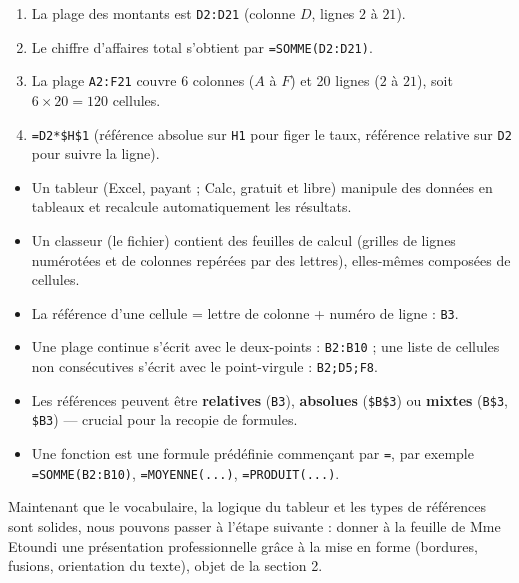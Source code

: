 \documentclass[11pt]{article}
\newcommand{\cle}[1]{{\popxbold\color{popdark}#1}}
\begin{document}
\begin{corrige}[Exercice 1]
\begin{enumerate}
\item La plage des montants est \texttt{D2:D21} (colonne $D$, lignes $2$ à $21$).
\item Le chiffre d'affaires total s'obtient par \texttt{=SOMME(D2:D21)}.
\item La plage \texttt{A2:F21} couvre 6 colonnes ($A$ à $F$) et 20 lignes ($2$ à $21$), soit $6 \times 20 = 120$ cellules.
\item \texttt{=D2*\$H\$1} (référence absolue sur \texttt{H1} pour figer le taux, référence relative sur \texttt{D2} pour suivre la ligne).
\end{enumerate}
\end{corrige}

\begin{aretenir}
\begin{itemize}
\item Un \cle{tableur} (Excel, payant ; Calc, gratuit et libre) manipule des données en tableaux et recalcule automatiquement les résultats.
\item Un \cle{classeur} (le fichier) contient des \cle{feuilles de calcul} (grilles de lignes numérotées et de colonnes repérées par des lettres), elles-mêmes composées de \cle{cellules}.
\item La \cle{référence} d'une cellule = lettre de colonne + numéro de ligne : \texttt{B3}.
\item Une \cle{plage} continue s'écrit avec le deux-points : \texttt{B2:B10} ; une liste de cellules non consécutives s'écrit avec le point-virgule : \texttt{B2;D5;F8}.
\item Les références peuvent être \textbf{relatives} (\texttt{B3}), \textbf{absolues} (\texttt{\$B\$3}) ou \textbf{mixtes} (\texttt{B\$3}, \texttt{\$B3}) — crucial pour la recopie de formules.
\item Une \cle{fonction} est une formule prédéfinie commençant par \texttt{=}, par exemple \texttt{=SOMME(B2:B10)}, \texttt{=MOYENNE(...)}, \texttt{=PRODUIT(...)}.
\end{itemize}
\end{aretenir}

Maintenant que le vocabulaire, la logique du tableur et les types de références sont solides, nous pouvons passer à l'étape suivante : donner à la feuille de Mme Etoundi une présentation professionnelle grâce à la mise en forme (bordures, fusions, orientation du texte), objet de la section 2.
\end{document}
